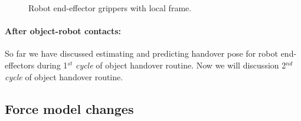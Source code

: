 \documentclass[a4paper, 12pt, oneside]{Thesis}  %
\begin{document}
\begin{figure}[hptb]
	\caption{Robot end-effector grippers with local frame.}
	\label{fig:gripper-intern}
\end{figure}



\paragraph*{After object-robot contacts:} So far we have discussed estimating and predicting handover pose for robot end-effectors during 1${}^{st}$ \textit{cycle} of object handover routine. Now we will discussion 2${}^{nd}$ \textit{cycle} of object handover routine.






%

\subsection{Force model changes}
\end{document}
